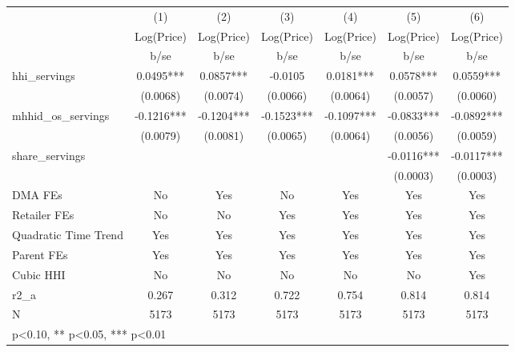{
\def\sym#1{\ifmmode^{#1}\else\(^{#1}\)\fi}
\begin{tabular}{l*{6}{c}}
\hline\hline
                    &\multicolumn{1}{c}{(1)}   &\multicolumn{1}{c}{(2)}   &\multicolumn{1}{c}{(3)}   &\multicolumn{1}{c}{(4)}   &\multicolumn{1}{c}{(5)}   &\multicolumn{1}{c}{(6)}   \\
                    &  Log(Price)   &  Log(Price)   &  Log(Price)   &  Log(Price)   &  Log(Price)   &  Log(Price)   \\
                    &        b/se   &        b/se   &        b/se   &        b/se   &        b/se   &        b/se   \\
\hline
hhi\_servings        &      0.0495***&      0.0857***&     -0.0105   &      0.0181***&      0.0578***&      0.0559***\\
                    &    (0.0068)   &    (0.0074)   &    (0.0066)   &    (0.0064)   &    (0.0057)   &    (0.0060)   \\
mhhid\_os\_servings   &     -0.1216***&     -0.1204***&     -0.1523***&     -0.1097***&     -0.0833***&     -0.0892***\\
                    &    (0.0079)   &    (0.0081)   &    (0.0065)   &    (0.0064)   &    (0.0056)   &    (0.0059)   \\
share\_servings      &               &               &               &               &     -0.0116***&     -0.0117***\\
                    &               &               &               &               &    (0.0003)   &    (0.0003)   \\
DMA FEs             &          No   &         Yes   &          No   &         Yes   &         Yes   &         Yes   \\
Retailer FEs        &          No   &          No   &         Yes   &         Yes   &         Yes   &         Yes   \\
Quadratic Time Trend &         Yes   &         Yes   &         Yes   &         Yes   &         Yes   &         Yes   \\
Parent FEs          &         Yes   &         Yes   &         Yes   &         Yes   &         Yes   &         Yes   \\
Cubic HHI           &          No   &          No   &          No   &          No   &          No   &         Yes   \\
\hline
r2\_a                &       0.267   &       0.312   &       0.722   &       0.754   &       0.814   &       0.814   \\
N                   &        5173   &        5173   &        5173   &        5173   &        5173   &        5173   \\
\hline\hline
\multicolumn{7}{l}{\footnotesize * p<0.10, ** p<0.05, *** p<0.01}\\
\end{tabular}
}
